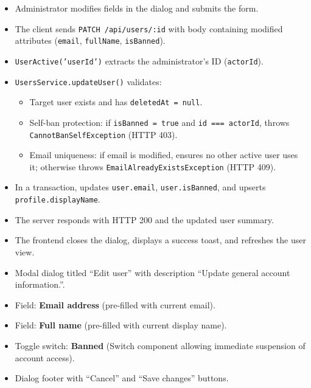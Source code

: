 \begin{itemize}[leftmargin=1.6em,topsep=3pt,itemsep=2pt,parsep=0pt,label=$\bullet$]
    \item Administrator modifies fields in the dialog and submits the form.
    \item The client sends \texttt{PATCH /api/users/:id} with body containing modified attributes (\texttt{email}, \texttt{fullName}, \texttt{isBanned}).
    \item \texttt{UserActive('userId')} extracts the administrator's ID (\texttt{actorId}).
    \item \texttt{UsersService.updateUser()} validates:
        \begin{itemize}[leftmargin=1.6em,topsep=2pt,itemsep=2pt,parsep=0pt]
            \item Target user exists and has \texttt{deletedAt = null}.
            \item Self-ban protection: if \texttt{isBanned = true} and \texttt{id === actorId}, throws \texttt{CannotBanSelfException} (HTTP 403).
            \item Email uniqueness: if email is modified, ensures no other active user uses it; otherwise throws \texttt{EmailAlreadyExistsException} (HTTP 409).
        \end{itemize}
    \item In a transaction, updates \texttt{user.\allowbreak{}email}, \texttt{user.\allowbreak{}isBanned}, and upserts \texttt{profile.\allowbreak{}displayName}.
    \item The server responds with HTTP 200 and the updated user summary.
    \item The frontend closes the dialog, displays a success toast, and refreshes the user view.
\end{itemize}

\begin{itemize}[leftmargin=1.6em,topsep=3pt,itemsep=2pt,parsep=0pt,label=$\bullet$]
    \item Modal dialog titled ``Edit user'' with description ``Update general account information.''.
    \item Field: \textbf{Email address} (pre-filled with current email).
    \item Field: \textbf{Full name} (pre-filled with current display name).
    \item Toggle switch: \textbf{Banned} (Switch component allowing immediate suspension of account access).
    \item Dialog footer with ``Cancel'' and ``Save changes'' buttons.
\end{itemize}

